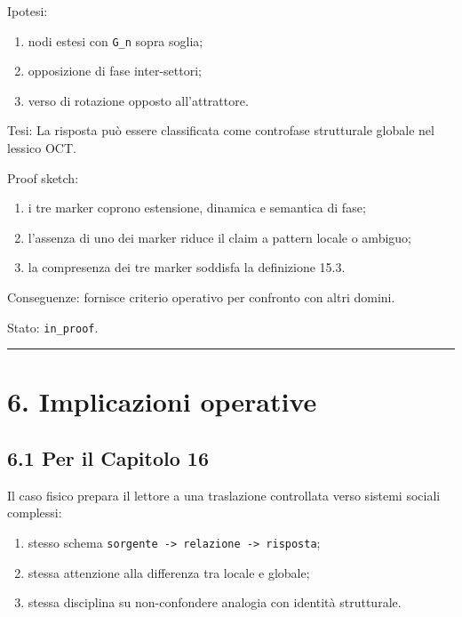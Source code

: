 Ipotesi:

\begin{enumerate}
\def\labelenumi{\arabic{enumi}.}
\tightlist
\item
  nodi estesi con \texttt{G\_n} sopra soglia;
\item
  opposizione di fase inter-settori;
\item
  verso di rotazione opposto all'attrattore.
\end{enumerate}

Tesi:
La risposta può essere classificata come controfase strutturale globale nel lessico OCT.

Proof sketch:

\begin{enumerate}
\def\labelenumi{\arabic{enumi}.}
\tightlist
\item
  i tre marker coprono estensione, dinamica e semantica di fase;
\item
  l'assenza di uno dei marker riduce il claim a pattern locale o ambiguo;
\item
  la compresenza dei tre marker soddisfa la definizione 15.3.
\end{enumerate}

Conseguenze:
fornisce criterio operativo per confronto con altri domini.

Stato: \texttt{in\_proof}.

\begin{center}\rule{0.5\linewidth}{0.5pt}\end{center}

\section{6. Implicazioni operative}

\subsection{6.1 Per il Capitolo 16}

Il caso fisico prepara il lettore a una traslazione controllata verso sistemi sociali complessi:

\begin{enumerate}
\def\labelenumi{\arabic{enumi}.}
\tightlist
\item
  stesso schema \texttt{sorgente\ -\textgreater{}\ relazione\ -\textgreater{}\ risposta};
\item
  stessa attenzione alla differenza tra locale e globale;
\item
  stessa disciplina su non-confondere analogia con identità strutturale.
\end{enumerate}

